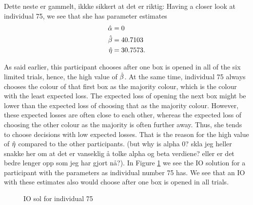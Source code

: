 \newpage
Dette neste er gammelt, ikkke sikkert at det er riktig:
Having a closer look at individual 75, we see that she has parameter estimates
\begin{equation}
\label{mles_lim_person75}
    \begin{aligned}
        \hat{\alpha} &= 0\\
        \hat{\beta} &= 40.7103\\
        \hat{\eta} &= 30.7573.
    \end{aligned}
\end{equation}



As said earlier, this participant chooses after one box is opened in all of the six limited trials, hence, the high value of $\hat{\beta}$. At the same time, individual 75 always chooses the colour of that first box as the majority colour, which is the colour with the least expected loss. The expected loss of opening the next box might be lower than the expected loss of choosing that as the majority colour. However, these expected losses are often close to each other, whereas the expected loss of choosing the other colour as the majority is often further away. Thus, she tends to choose decisions with low expected losses. That is the reason for the high value of $\hat{\eta}$ compared to the other participants. (but why is alpha 0? skla jeg heller snakke her om at det er vanseklig å tolke alpha og beta verdiene? eller er det bedre lenger opp som jeg har gjort nå?). In Figure \ref{fig:IO_sol_person_75_lim} we see the IO solution for a participant with the parameters as individual number 75 has. We see that an IO with these estimates also would choose after one box is opened in all trials. 
\begin{figure}
    \centering
    \scalebox{0.8}{}
    \caption[IO solution for individual number 75, limited]{IO sol for individual 75}
    \label{fig:IO_sol_person_75_lim}
\end{figure}

